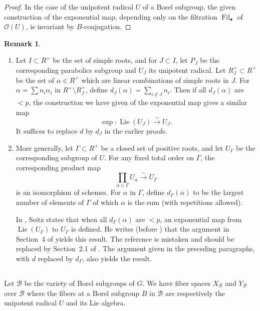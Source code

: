\documentclass[11pt,a4paper]{article}
\theoremstyle{plain}
\theoremstyle{definition}
\newtheorem{remark}[theorem]{Remark}
\DeclareMathOperator{\Lie}{Lie}
\DeclareMathOperator{\Fil}{Fil}
\begin{document}
\begin{proof}
In the case of the unipotent radical $U$ of a Borel subgroup, the given construction of the exponential map, depending only on the filtration $\Fil_\bullet$ of $\mathcal{O}(U)$, is invariant by $B$-conjugation. \qedhere
\end{proof}

\begin{remark} \label{rem:6.6}
\leavevmode
\begin{enumerate}
\item[(i)] Let $I \subset R^+$ be the set of simple roots, and for $J \subset I$, let $P_J$ be the corresponding parabolics subgroup and $U_J$ its unipotent radical. Let $R_J^+ \subset R^+$ be the set of $\alpha \in R^+$ which are linear combinations of simple roots in $J$. For $\alpha = \sum n_i \alpha_i$ in $R^+ \setminus R_J^+$, define $d_J(\alpha) = \sum_{i \notin J} n_i$. Then if all $d_J(\alpha)$ are $< p$, the construction we have given of the exponential map gives a similar map
\begin{equation} \label{eq:6.6.1}
\exp : \Lie(U_J) \xrightarrow{\sim} U_J.
\end{equation}
It suffices to replace $d$ by $d_J$ in the earlier proofs.

\item[(ii)] More generally, let $\Gamma \subset R^+$ be a closed set of positive roots, and let $U_\Gamma$ be the corresponding subgroup of $U$. For any fixed total order on $\Gamma$, the corresponding product map
\begin{equation} \label{eq:6.6.2}
\prod_{\alpha \in \Gamma} U_\alpha \xrightarrow{\sim} U_\Gamma
\end{equation}
is an isomorphism of schemes. For $\alpha$ in $\Gamma$, define $d_\Gamma(\alpha)$ to be the largest number of elements of $\Gamma$ of which $\alpha$ is the sum (with repetitions allowed).

In \cite{Sei}, Seitz states that when all $d_\Gamma(\alpha)$ are $< p$, an exponential map from $\Lie(U_\Gamma)$ to $U_\Gamma$ is defined. He writes (before \cite[Proposition~5.1, page~483]{Sei}) that the argument in Section~4 of \cite{S1} yields this result. The reference is mistaken and should be replaced by Section~2.1 of \cite{S4}. The argument given in the preceding paragraphs, with $d$ replaced by $d_\Gamma$, also yields the result.
\end{enumerate}
\end{remark}

\subsection{} \label{sec:6.7}
Let $\mathcal{B}$ be the variety of Borel subgroups of $G$. We have fiber spaces $X_\mathcal{B}$ and $Y_\mathcal{B}$ over $\mathcal{B}$ where the fibers at a Borel subgroup $B$ in $\mathcal{B}$ are respectively the unipotent radical $U$ and its Lie algebra.
\end{document}
